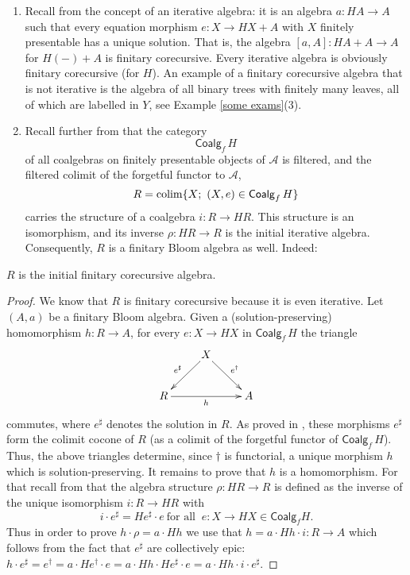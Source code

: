 \documentclass{LMCS}
\theoremstyle{plain}
\theoremstyle{definition}
\numberwithin{equation}{section}
\begin{document}
\begin{rem}\hfill
\begin{enumerate}[label=\({\alph*}]
\item Recall from \cite{amv_atwork} the concept of an iterative algebra: it is an algebra $a:HA\rightarrow A$ such that every equation morphism $e:X\rightarrow HX+A$ with $X$ finitely presentable has a unique solution. That is, the algebra $[a,A]:HA+A \rightarrow A$ for $H(-)+A$ is finitary corecursive. Every iterative algebra is obviously finitary corecursive (for $H$). An example of a finitary corecursive algebra that is not iterative is the algebra of all binary trees with finitely many leaves, all of which are labelled in $Y$, see Example \ref{some exams}(3).

\item Recall further from \cite{amv_atwork} that the
  category $$\mathsf{Coalg}_f\,H$$ of all coalgebras on finitely
  presentable objects of $\mathcal A$ is filtered, and the filtered
  colimit of the forgetful functor to $\mathcal A$, $$R={\rm
    colim}\{X;\ (X,e)\in \mathsf{Coalg}_f\,H\}$$ carries the structure
  of a coalgebra $i:R\to HR$. This structure is an isomorphism, and
  its inverse $\rho:HR\rightarrow R$ is the initial iterative
  algebra. Consequently, $R$ is a finitary Bloom algebra as
  well. Indeed:
\end{enumerate}
\end{rem}

\begin{prop}\label{R is i.f.c.a}
$R$ is the initial finitary corecursive algebra.
\end{prop}

\begin{proof}
We know that $R$ is finitary corecursive because it is even iterative. Let $(A,a)$ be a finitary Bloom algebra. Given a (solution-preserving) homomorphism $h:R\rightarrow A$, for every $e:X\rightarrow HX$ in $\mathsf{Coalg}_f\,H$ the triangle
$$\xymatrix{
&X\ar[ld]_{e^\sharp}\ar[rd]^{e^\dag}\\
R\ar[rr]_h&&A\\
}$$
commutes, where $e^\sharp$ denotes the solution in $R$. As proved in \cite{amv_atwork}, these morphisms $e^\sharp$ form the colimit cocone of $R$ (as a colimit of the forgetful functor of $\mathsf{Coalg}_f\,H$). Thus, the above triangles determine, since $\dag$ is functorial, a unique morphism $h$ which is solution-preserving. It remains to prove that $h$ is a homomorphism. For that recall from \cite{amv_atwork} that the algebra structure $\rho :HR\rightarrow R$ is defined as the inverse of the unique isomorphism $i:R\rightarrow HR$ with $$i\cdot e^\sharp =He^\sharp\cdot e\ \text{for all }\ e:X\rightarrow HX \in \mathsf{Coalg}_fH.$$
Thus in order to prove $h\cdot \rho=a\cdot Hh$ we use that $h=a\cdot Hh\cdot i:R\rightarrow A$ which follows from the fact that $e^\sharp$ are collectively epic: $h\cdot e^\sharp=e^\dag=a\cdot He^\dag\cdot e=a\cdot Hh\cdot He^\sharp\cdot e=a\cdot Hh\cdot i\cdot e^\sharp$.
\end{proof}
\end{document}
